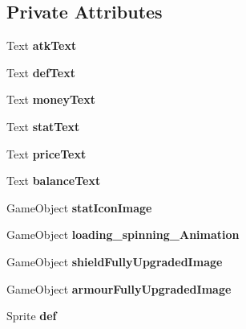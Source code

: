 \subsection*{Private Attributes}
\begin{DoxyCompactItemize}
\item 
\mbox{\label{class_inventory_a6be0183125fd410aab7aeaf701db4741}} 
Text {\bfseries atk\+Text}
\item 
\mbox{\label{class_inventory_aa126dcd06ebf1ea9eec5aa6ca1e83a8d}} 
Text {\bfseries def\+Text}
\item 
\mbox{\label{class_inventory_aa93a5a923daa1233401192da490e8e27}} 
Text {\bfseries money\+Text}
\item 
\mbox{\label{class_inventory_a00da1044a0d829c9b8e0156f8b059db7}} 
Text {\bfseries stat\+Text}
\item 
\mbox{\label{class_inventory_a357c419671e7cb628288360cc7acd604}} 
Text {\bfseries price\+Text}
\item 
\mbox{\label{class_inventory_a904e3fced18e5366bb5b89c7e4262874}} 
Text {\bfseries balance\+Text}
\item 
\mbox{\label{class_inventory_a93a55231b5b247c2e7b0dfee9ce2dd3d}} 
Game\+Object {\bfseries stat\+Icon\+Image}
\item 
\mbox{\label{class_inventory_a1d9b045b21d5bd72f6a6f6a94d535c72}} 
Game\+Object {\bfseries loading\+\_\+spinning\+\_\+\+Animation}
\item 
\mbox{\label{class_inventory_a19d58719a7e83a39bedb7514bd938649}} 
Game\+Object {\bfseries shield\+Fully\+Upgraded\+Image}
\item 
\mbox{\label{class_inventory_ad414f904995e16ebdd58cf18700d4e59}} 
Game\+Object {\bfseries armour\+Fully\+Upgraded\+Image}
\item 
\mbox{\label{class_inventory_a62372c6936045f41bfa87a95c1aec3c8}} 
Sprite {\bfseries def}

\end{DoxyCompactItemize}

